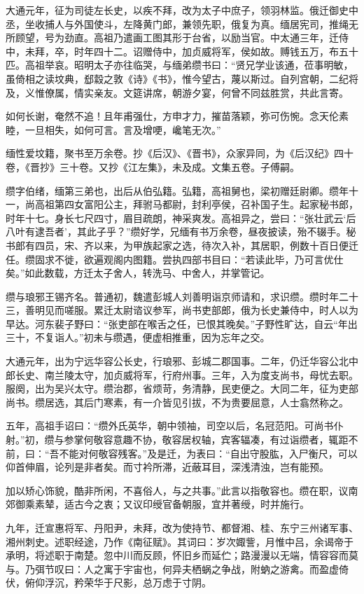 \documentclass[12pt,UTF8]{ctexbook}
\begin{document}
大通元年，征为司徒左长史，以疾不拜，改为太子中庶子，领羽林监。俄迁御史中丞，坐收捕人与外国使斗，左降黄门郎，兼领先职，俄复为真。缅居宪司，推绳无所顾望，号为劲直。高祖乃遣画工图其形于台省，以励当官。中太通三年，迁侍中，未拜，卒，时年四十二。诏赠侍中，加贞威将军，侯如故。赙钱五万，布五十匹。高祖举哀。昭明太子亦往临哭，与缅弟缵书曰：“贤兄学业该通，莅事明敏，虽倚相之读坟典，郄縠之敦《诗》《书》，惟今望古，蔑以斯过。自列宫朝，二纪将及，义惟僚属，情实亲友。文筵讲席，朝游夕宴，何曾不同兹胜赏，共此言寄。

如何长谢，奄然不追！且年甫强仕，方申才力，摧苗落颖，弥可伤惋。念天伦素睦，一旦相失，如何可言。言及增哽，巉笔无次。”

缅性爱坟籍，聚书至万余卷。抄《后汉》、《晋书》，众家异同，为《后汉纪》四十卷，《晋抄》三十卷。又抄《江左集》，未及成。文集五卷。子傅嗣。

缵字伯绪，缅第三弟也，出后从伯弘籍。弘籍，高祖舅也，梁初赠廷尉卿。缵年十一，尚高祖第四女富阳公主，拜驸马都尉，封利亭侯，召补国子生。起家秘书郎，时年十七。身长七尺四寸，眉目疏朗，神采爽发。高祖异之，尝曰：“张壮武云‘后八叶有逮吾者’，其此子乎？”缵好学，兄缅有书万余卷，昼夜披读，殆不辍手。秘书郎有四员，宋、齐以来，为甲族起家之选，待次入补，其居职，例数十百日便迁任。缵固求不徙，欲遍观阁内图籍。尝执四部书目曰：“若读此毕，乃可言优仕矣。”如此数载，方迁太子舍人，转洗马、中舍人，并掌管记。

缵与琅邪王锡齐名。普通初，魏遣彭城人刘善明诣京师请和，求识缵。缵时年二十三，善明见而嗟服。累迁太尉谘议参军，尚书吏部郎，俄为长史兼侍中，时人以为早达。河东裴子野曰：“张吏部在喉舌之任，已恨其晚矣。”子野性旷达，自云“年出三十，不复诣人。”初未与缵遇，便虚相推重，因为忘年之交。

大通元年，出为宁远华容公长史，行琅邪、彭城二郡国事。二年，仍迁华容公北中郎长史、南兰陵太守，加贞威将军，行府州事。三年，入为度支尚书，母忧去职。服阕，出为吴兴太守。缵治郡，省烦苛，务清静，民吏便之。大同二年，征为吏部尚书。缵居选，其后门寒素，有一介皆见引拔，不为贵要屈意，人士翕然称之。

五年，高祖手诏曰：“缵外氏英华，朝中领袖，司空以后，名冠范阳。可尚书仆射。”初，缵与参掌何敬容意趣不协，敬容居权轴，宾客辐凑，有过诣缵者，辄距不前，曰：“吾不能对何敬容残客。”及是迁，为表曰：“自出守股肱，入尸衡尺，可以仰首伸眉，论列是非者矣。而寸衿所滞，近蔽耳目，深浅清浊，岂有能预。

加以矫心饰貌，酷非所闲，不喜俗人，与之共事。”此言以指敬容也。缵在职，议南郊御乘素辇，适古今之衷；又议印绶官备朝服，宜并著绶，时并施行。

九年，迁宣惠将军、丹阳尹，未拜，改为使持节、都督湘、桂、东宁三州诸军事、湘州刺史。述职经途，乃作《南征赋》。其词曰：岁次娵訾，月惟中吕，余谒帝于承明，将述职于南楚。忽中川而反顾，怀旧乡而延伫；路漫漫以无端，情容容而莫与。乃弭节叹曰：人之寓于宇宙也，何异夫栖蜗之争战，附蚋之游禽。而盈虚倚伏，俯仰浮沉，矜荣华于尺影，总万虑于寸阴。
\end{document}
